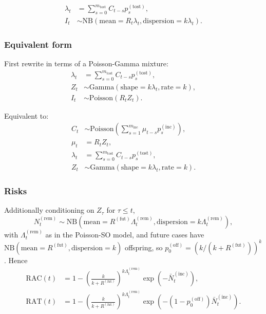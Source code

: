 \documentclass{article}
\newcommand{\PoissonDist}[1]{\mathrm{Poisson}\left(#1\right)}
\newcommand{\NBDist}[2]{\mathrm{NB}\left(\mathrm{mean}=#1,
\mathrm{dispersion}=#2\right)}
\newcommand{\GammaDist}[2]{\mathrm{Gamma}\left(\mathrm{shape}=#1,
\mathrm{rate}=#2\right)}
\newcommand{\incPMF}{p^{(\mathrm{inc})}}
\newcommand{\tostPMF}{p^{(\mathrm{tost})}}
\newcommand{\offPMF}{p^{(\mathrm{off})}}
\newcommand{\Rfut}{R^{(\mathrm{fut})}}
\newcommand{\RAC}{\mathrm{RAC}}
\newcommand{\RAT}{\mathrm{RAT}}
\begin{document}
\begin{align}
  \lambda_{t} &= \sum_{s=0}^{m_{\mathrm{tost}}} C_{t-s} \tostPMF_{s},\\
  I_t &\sim \NBDist{R_{t}\lambda_{t}}{k\lambda_{t}}.
\end{align}

\subsubsection{Equivalent form}

First rewrite in terms of a Poisson-Gamma mixture:
\begin{align}
  \lambda_{t} &= \sum_{s=0}^{m_{\mathrm{tost}}} C_{t-s} \tostPMF_{s},\\
  Z_t &\sim \GammaDist{k\lambda_{t}}{k},\\
  I_t &\sim \PoissonDist{R_{t}Z_t}.
\end{align}

Equivalent to:
\begin{align}
  C_t &\sim \PoissonDist{\sum_{s=1}^{m_{\mathrm{inc}}}
  \mu_{t-s} \incPMF_{s}},\\
  \mu_t &= R_{t}Z_t,\\
  \lambda_{t} &= \sum_{s=0}^{m_{\mathrm{tost}}} C_{t-s} \tostPMF_{s},\\
  Z_t &\sim \GammaDist{k\lambda_{t}}{k}.
\end{align}

\subsubsection{Risks}

Additionally conditioning on \(Z_\tau\) for \(\tau\leq t\),
\begin{equation}
  N^{(\mathrm{rem})}_{t} \sim
  \NBDist{\Rfut\Lambda^{(\mathrm{rem})}_{t}}{k\Lambda^{(\mathrm{rem})}_{t}},
\end{equation}
with \(\Lambda^{(\mathrm{rem})}_{t}\) as in the Poisson-SO model, and
future cases have \(\NBDist{\Rfut}{k}\) offspring, so
\(\offPMF_0=\left(k/(k+\Rfut)\right)^{k}\). Hence
\begin{align}
  \RAC(t)&=1-\left(\frac{k}{k+\Rfut}\right)^{k\Lambda_{t}^{(\mathrm{rem})}}\exp\left(-\bar
  N_t^{(\mathrm{inc})}\right),\\
  \RAT(t)&=1-\left(\frac{k}{k+\Rfut}\right)^{k\Lambda_{t}^{(\mathrm{rem})}}\exp\left(-\left(1-\offPMF_0\right)\bar
  N_t^{(\mathrm{inc})}\right).
\end{align}
\end{document}

